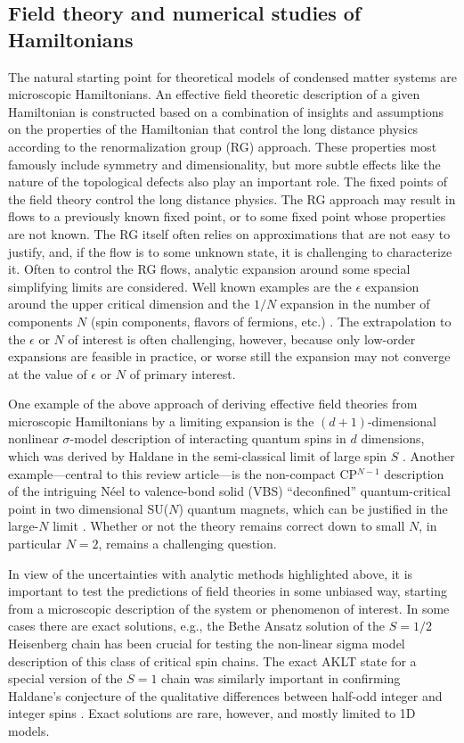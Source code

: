 \documentclass[range]{ar2e}
\begin{document}
\subsection{Field theory and numerical studies of Hamiltonians}

The natural starting point for theoretical models of condensed matter systems are microscopic Hamiltonians.
An effective field theoretic description  of a given Hamiltonian 
is constructed based on a combination of insights and assumptions on the properties of the Hamiltonian that control the long distance physics according to the renormalization group (RG) approach. These properties most famously include symmetry and dimensionality, but more subtle effects like the nature of the topological defects also play an important role.  The fixed points of the field theory control the long distance physics.
The RG approach may result in flows to a previously known fixed point, or to some fixed point
whose properties are not known. The RG itself often relies on approximations that are not easy
to justify, and, if the flow is to some unknown state, it is challenging to characterize it. 
Often to control the RG flows, analytic expansion around some special simplifying limits are considered. Well known examples are the $\epsilon$ expansion
around the upper critical dimension and the $1/N$ expansion in the number of components $N$ (spin components, flavors of fermions, etc.)
\cite{herbut2007:book,barber1972:lgNeps}. The
extrapolation to the $\epsilon$ or $N$ of interest is often challenging, however, because only low-order
expansions are feasible in practice, or worse still the expansion may not converge at the value of $\epsilon$ or $N$ of primary interest.

One example of the above approach of deriving effective field theories from microscopic Hamiltonians by a limiting expansion is the $(d+1)$-dimensional
nonlinear $\sigma$-model description of interacting quantum spins in $d$ dimensions, which was derived by Haldane in 
the semi-classical limit of large spin $S$ \cite{Haldane83,Chakravarty89,Auerbach94}.  Another example---central to this review article---is the 
non-compact CP$^{N-1}$ description of the intriguing  N\'eel to valence-bond solid (VBS) ``deconfined'' quantum-critical point in two dimensional 
SU($N$) quantum magnets, which can be justified in the large-$N$ limit \cite{Senthil04a,Sachdev08}. Whether or not the theory remains correct down to 
small $N$, in particular $N=2$, remains a challenging question.

In view of the uncertainties with analytic methods highlighted above, it is important to test the predictions of field theories in some unbiased way,
starting from a microscopic description of the system or phenomenon of interest. In some cases there are exact solutions, 
e.g., the Bethe Ansatz solution of the $S=1/2$ Heisenberg chain \cite{Bethe31} has been crucial for testing 
the non-linear sigma model description of this class of critical spin chains. The exact AKLT state \cite{affleck88} for a special 
version of the $S=1$ chain was similarly important in confirming Haldane's conjecture of the qualitative differences between 
half-odd integer and integer spins \cite{Haldane83}. Exact solutions are rare, however, and mostly limited to 1D models.
 
\end{document}
